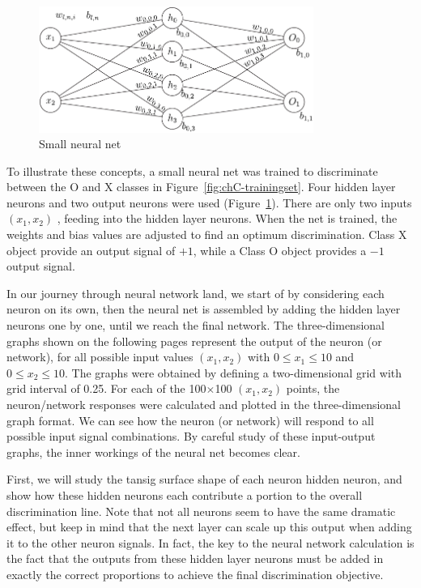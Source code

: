 \begin{figure}[tb]
\centering
\includegraphics[width=0.8\textwidth]{eps/neuralnetconcept02}
\caption{Small neural net\label{fig:neuralnetconcept02}}
\end{figure}


To illustrate these concepts, a small neural net was trained to discriminate between the O and X classes in Figure~\ref{fig:chC-trainingset}.  Four hidden layer neurons and two output neurons were used (Figure~\ref{fig:neuralnetconcept02}).  There are only two inputs $(x_1,x_2)$ , feeding into the hidden layer neurons.  When the net is trained, the weights and bias values are adjusted to find an optimum discrimination.  Class X object provide an output signal of $+1$, while a Class O object provides a $-1$ output signal.  

In our journey through neural network land,  we start of by considering each neuron on its own, then the neural net is assembled by adding the hidden layer neurons one by one, until we reach the final network.  The three-dimensional graphs shown on the following pages represent the output of the neuron (or network), for all possible input values  $(x_1,x_2)$  with $0\leq x_1 \leq 10$  and  $0\leq x_2 \leq 10$.  The graphs were obtained by defining a two-dimensional grid with grid interval of 0.25.  For each of the 100$\times$100  $(x_1,x_2)$ points, the neuron/network responses were calculated and plotted in the three-dimensional graph format.   We can see how the neuron (or network) will respond to all possible input signal combinations.   By careful study of these input-output graphs, the inner workings of the neural net becomes clear.

First, we will study the tansig surface shape of each neuron hidden neuron, and show how these hidden neurons each contribute a portion to the overall discrimination line.  Note that not all neurons seem to have the same dramatic effect, but keep in mind that the next layer can scale up this output when adding it to the other neuron signals.  In fact, the key to the neural network calculation is the fact that the outputs from these hidden layer neurons must be added in exactly the correct proportions to achieve the final discrimination objective.  

